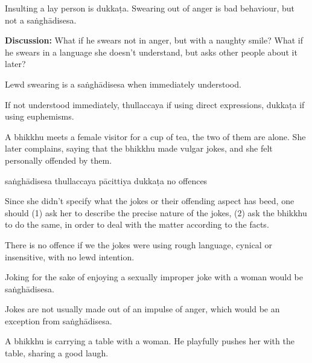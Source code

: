 \begin{exam}{\autoExamName}
\begin{problem*}
\begin{parts}
    \begin{solution}
      Insulting a lay person is dukkaṭa.
      Swearing out of anger is bad behaviour, but not a saṅghādisesa.
    \end{solution}

    \bigskip

    \textbf{Discussion:} What if he swears not in anger, but with a naughty
    smile? What if he swears in a language she doesn't understand, but asks
    other people about it later?

    \begin{solution}
      Lewd swearing is a saṅghādisesa when immediately understood.

      If not understood immediately, thullaccaya if using direct expressions, dukkaṭa if using euphemisms.
    \end{solution}

    \bigskip

  \item A bhikkhu meets a female visitor for a cup of tea, the two of them are alone.
  She later complains, saying that the bhikkhu made vulgar jokes,
  and she felt personally offended by them.

    \bigskip

    \begin{answers}{5}
      \bChoices
       saṅghādisesa\eAns
       thullaccaya\eAns
       pācittiya\eAns
       dukkaṭa\eAns
       no offences\eAns
      \eChoices
    \end{answers}

    \begin{solution}
      Since she didn't specify what the jokes or their offending aspect has beed,
      one should (1) ask her to describe the precise nature of the jokes,
      (2) ask the bhikkhu to do the same,
      in order to deal with the matter according to the facts.

      There is no offence if we the jokes were using
      rough language, cynical or insensitive, with no lewd intention.

      Joking for the sake of enjoying a sexually improper joke with a woman would be saṅghādisesa.

      Jokes are not usually made out of an impulse of anger, which would be an exception from saṅghādisesa.
    \end{solution}

    \bigskip

  \item A bhikkhu is carrying a table with a woman. He playfully pushes her
    with the table, sharing a good laugh.


\end{parts}
\end{problem*}
\end{exam}
